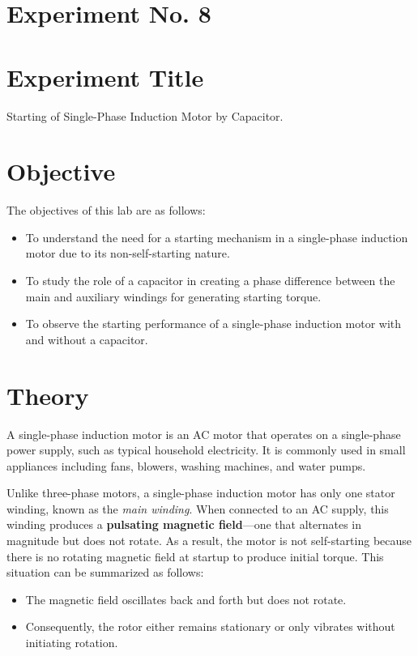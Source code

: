 \documentclass[a4paper,12pt]{article}
\begin{document}
	\section{Experiment No. 8}
	
	\section{Experiment Title }
Starting of Single-Phase Induction Motor by Capacitor.
	
	\section{Objective}
	
	The objectives of this lab are as follows:
	\begin{itemize}
		\item 	To understand the need for a starting mechanism in a single-phase induction motor due to its non-self-starting nature.
		\item 	To study the role of a capacitor in creating a phase difference between the main and auxiliary windings for generating starting torque.
		
		\item  To observe the starting performance of a single-phase induction motor with and without a capacitor.
		
		
	\end{itemize}
	\section{Theory}
	
	A single-phase induction motor is an AC motor that operates on a single-phase power supply, such as typical household electricity. It is commonly used in small appliances including fans, blowers, washing machines, and water pumps.
	
	Unlike three-phase motors, a single-phase induction motor has only one stator winding, known as the \textit{main winding}. When connected to an AC supply, this winding produces a \textbf{pulsating magnetic field}—one that alternates in magnitude but does not rotate. As a result, the motor is not self-starting because there is no rotating magnetic field at startup to produce initial torque. This situation can be summarized as follows:
	
	\begin{itemize}
		\item The magnetic field oscillates back and forth but does not rotate.
		\item Consequently, the rotor either remains stationary or only vibrates without initiating rotation.
	\end{itemize}
	
\end{document}
